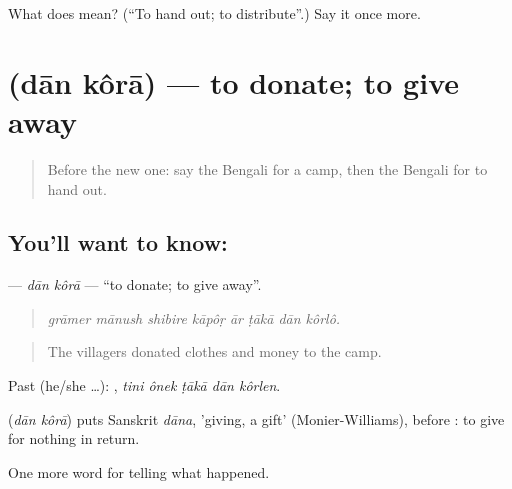 \begin{tcolorbox}[breakable,colback=teal!4,colframe=teal!35!black,title={Before you move on}]
What does   mean? (\textquotedblleft{}To hand out; to distribute\textquotedblright{}.) Say it once more.
\end{tcolorbox}
\section[\texorpdfstring{\bn{দান} \bn{করা} (dān kôrā)}{দান করা (dān kôrā)}]{  (dān kôrā) — to donate; to give away}

\label{lesson:BN-C291-dan-kora}



\begin{quote}
Before the new one: say the Bengali for a camp, then the Bengali for to hand out.
\end{quote}

\subsection*{You'll want to know:  }
\textbf{ } — \emph{dān kôrā} — \textquotedblleft{}to donate; to give away\textquotedblright{}.

\begin{quote}
       
\end{quote}

\begin{quote}
\emph{grāmer mānush shibire kāpôṛ ār ṭākā dān kôrlô.}
\end{quote}

\begin{quote}
The villagers donated clothes and money to the camp.
\end{quote}

Past (he/she …):     , \emph{tini ônek ṭākā dān kôrlen}.

\begin{cousinweb}
\textbf{ } (\emph{dān kôrā}) puts Sanskrit \emph{dāna}, 'giving, a gift' (Monier-Williams), before : to give for nothing in return.
\end{cousinweb}

\begin{grammarlens}[title={What you've built}]
One more word for telling what happened.
\end{grammarlens}

